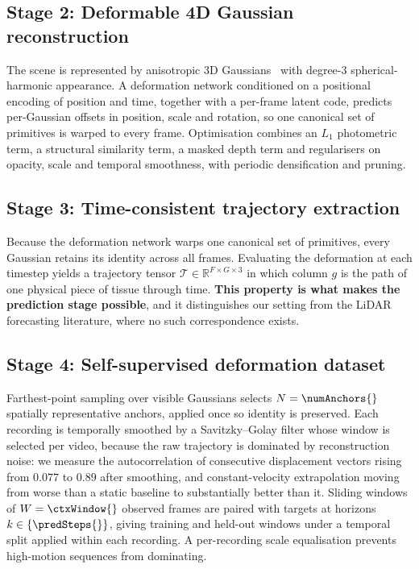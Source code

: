 \documentclass[conference]{IEEEtran}
\begin{document}
\subsection{Stage 2: Deformable 4D Gaussian reconstruction}
The scene is represented by anisotropic 3D Gaussians~\cite{kerbl2023gaussian} with
degree-3 spherical-harmonic appearance. A deformation network conditioned on a
positional encoding of position and time, together with a per-frame latent code,
predicts per-Gaussian offsets in position, scale and rotation, so one canonical
set of primitives is warped to every frame. Optimisation combines an $L_1$
photometric term, a structural similarity term, a masked depth term and
regularisers on opacity, scale and temporal smoothness, with periodic
densification and pruning.

\subsection{Stage 3: Time-consistent trajectory extraction}
Because the deformation network warps one canonical set of primitives, every
Gaussian retains its identity across all frames. Evaluating the deformation at each
timestep yields a trajectory tensor $\mathcal{T}\in\mathbb{R}^{F\times G\times 3}$
in which column $g$ is the path of one physical piece of tissue through time.
\textbf{This property is what makes the prediction stage possible}, and it
distinguishes our setting from the LiDAR forecasting literature, where no such
correspondence exists.

\subsection{Stage 4: Self-supervised deformation dataset}
Farthest-point sampling over visible Gaussians selects $N=\numAnchors{}$ spatially
representative anchors, applied once so identity is preserved. Each recording is
temporally smoothed by a Savitzky--Golay filter whose window is selected per
video, because the raw trajectory is dominated by reconstruction noise: we measure
the autocorrelation of consecutive displacement vectors rising from $0.077$ to
$0.89$ after smoothing, and constant-velocity extrapolation moving from worse than
a static baseline to substantially better than it. Sliding windows of
$W=\ctxWindow{}$ observed frames are paired with targets at horizons
$k\in\{\predSteps{}\}$, giving \numTrainWindows{} training and \numValWindows{}
held-out windows under a temporal split applied within each recording. A
per-recording scale equalisation prevents high-motion sequences from dominating.
\end{document}
